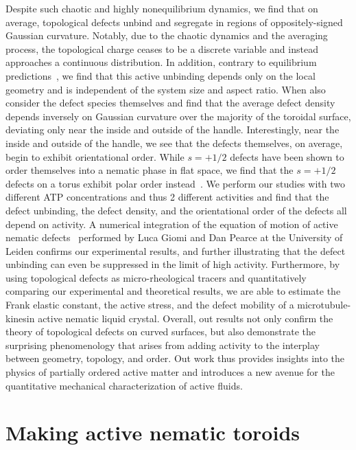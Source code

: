 Despite such chaotic and highly nonequilibrium dynamics, we find that on average, topological defects unbind and segregate in regions of oppositely-signed Gaussian curvature.
Notably, due to the chaotic dynamics and the averaging process, the topological charge ceases to be a discrete variable and instead approaches a continuous distribution.
In addition, contrary to equilibrium predictions~\cite{RN36,RN19,RN22,RN20,RN78}, we find that this active unbinding depends only on the local geometry and is independent of the system size and aspect ratio.
When also consider the defect species themselves and find that the average defect density depends inversely on Gaussian curvature over the majority of the toroidal surface, deviating only near the inside and outside of the handle.
Interestingly, near the inside and outside of the handle, we see that the defects themselves, on average, begin to exhibit orientational order.
While $s = +1/2$ defects have been shown to order themselves into a nematic phase in flat space, we find that the $s = +1/2$ defects on a torus exhibit polar order instead~\cite{RN27,RN6}.
We perform our studies with two different ATP concentrations and thus 2 different activities and find that the defect unbinding, the defect density, and the orientational order of the defects all depend on activity.
A numerical integration of the equation of motion of active nematic defects~\cite{RN11,RN8,RN9} performed by Luca Giomi and Dan Pearce at the University of Leiden confirms our experimental results, and further illustrating that the defect unbinding can even be suppressed in the limit of high activity.
Furthermore, by using topological defects as micro-rheological tracers and quantitatively comparing our experimental and theoretical results, we are able to estimate the Frank elastic constant, the active stress, and the defect mobility of a microtubule-kinesin active nematic liquid crystal.
Overall, out results not only confirm the theory of topological defects on curved surfaces, but also demonstrate the surprising phenomenology that arises from adding activity to the interplay between geometry, topology, and order. Out work thus provides insights into the physics of partially ordered active matter and introduces a new avenue for the quantitative mechanical characterization of active fluids.\\


\section{Making active nematic toroids}
